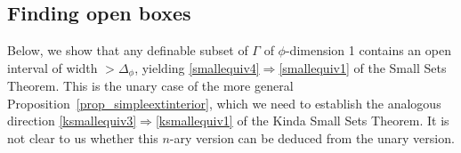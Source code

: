 \documentclass[11pt]{amsart}
\theoremstyle{plain}
\theoremstyle{definition}
\numberwithin{equation}{section}
\newcommand\0{\varnothing}
\begin{document}
\subsection{Finding open boxes}\label{finding_open_boxes_subsection}



Below, we show that any definable subset of $\Gamma$ of $\phi$-dimension 1 contains an open interval of width $>\Delta_\phi$, yielding \eqref{smallequiv4}$\Rightarrow$\eqref{smallequiv1} of the Small Sets Theorem. This is the unary case of the more general Proposition~\ref{prop_simpleextinterior}, which we need to establish the analogous direction \eqref{ksmallequiv3}$\Rightarrow$\eqref{ksmallequiv1} of the Kinda Small Sets Theorem. It is not clear to us whether this $n$-ary version can be deduced from the unary version.
\end{document}
